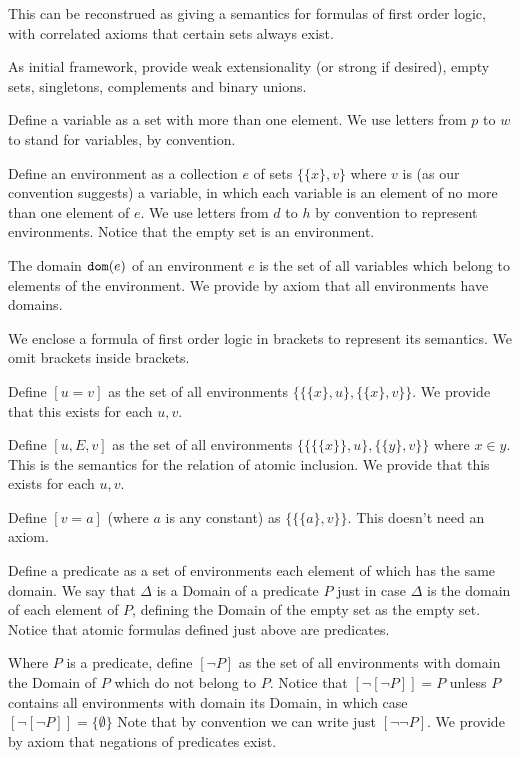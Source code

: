 \documentclass{slides}
\begin{document}
\begin{slide}
 
 This can be reconstrued as giving a semantics for formulas of first order logic, with correlated axioms that certain sets always exist.
 
 As initial framework, provide weak extensionality (or strong if desired), empty sets, singletons, complements and binary unions.
 
 Define a variable as a set with more than one element.  We use letters from $p$ to $w$ to stand for variables, by convention.
 
 Define an environment as a collection $e$ of sets $\{\{x\},v\}$ where $v$ is (as our convention suggests) a variable, in which each variable
 is an element of no more than one element of $e$.  We use letters from $d$ to $h$ by convention to represent environments.  Notice that the empty set is an environment.
 
 The domain ${\tt dom}(e)$ of an environment $e$ is the set of all variables which belong to elements of the environment.  We provide by axiom
 that all environments have domains.
 
 We enclose a formula of first order logic in brackets to represent its semantics.  We omit brackets inside brackets.
 
 Define $[u=v]$ as the set of all environments $\{\{\{x\},u\},\{\{x\},v\}\}$.  We provide that this exists for each $u,v$.
 
 Define $[u,E,v]$ as the set of all environments $\{\{\{\{x\}\},u\},\{\{y\},v\}\}$ where $x \in y$.  This is the semantics for the relation of atomic inclusion.  We provide that this exists for each $u,v$.
 
 Define $[v=a]$ (where $a$ is any constant) as $\{\{\{a\},v\}\}$.  This doesn't need an axiom.
 
 Define a predicate as a set of environments each element of which has the same domain.  We say that $\Delta$ is a Domain of a predicate $P$ just in case $\Delta$ is the domain of each element of $P$, defining the Domain of the empty set as the empty set.    Notice that atomic formulas defined just above are predicates.
 
 Where $P$ is a predicate, define $[\neg P]$ as the set of all environments with domain the Domain of $P$ which do not belong to $P$.
 Notice that $[\neg[\neg P]]=P$ unless $P$ contains all environments with domain its Domain, in which case $[\neg[\neg P]]=\{\emptyset\}$
Note that by convention we can write just $[\neg\neg P]$. We provide by axiom that negations of predicates exist.


\end{slide}
\end{document}
